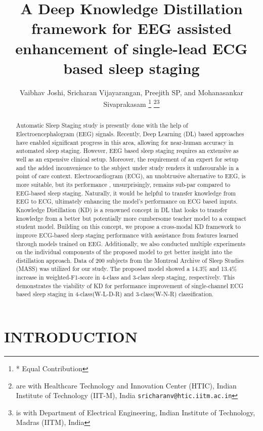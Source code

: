 \documentclass[letterpaper, 10 pt, conference]{ieeeconf}
\title{\LARGE \bf
A Deep Knowledge Distillation framework for EEG assisted enhancement of single-lead ECG based sleep staging
}
\author{Vaibhav Joshi, Sricharan Vijayarangan, Preejith SP, and Mohanasankar Sivaprakasam  \thanks{* Equal Contribution}
\thanks{ are with Healthcare Technology and Innovation Center (HTIC),
        Indian Institute of Technology (IIT-M), India
        {\tt\small sricharanv@htic.iitm.ac.in}}\thanks{ is with Department of Electrical Engineering,
        Indian Institute of Technology, Madras (IITM), India
        {}}}
\begin{document}
\maketitle



\begin{abstract}



Automatic Sleep Staging study is presently done with the help of Electroencephalogram (EEG) signals. Recently, Deep Learning (DL) based approaches have enabled significant progress in this area, allowing for near-human accuracy in automated sleep staging. However, EEG based sleep staging requires an extensive as well as an expensive clinical setup. Moreover, the requirement of an expert for setup and the added inconvenience to the subject under study renders it unfavourable in a point of care context. Electrocardiogram (ECG), an unobtrusive alternative to EEG, is more suitable, but its performance , unsurprisingly, remains sub-par compared to EEG-based sleep staging. Naturally, it would be helpful to transfer knowledge from EEG to ECG, ultimately enhancing the model's performance on ECG based inputs. Knowledge Distillation (KD) is a renowned concept in DL that looks to transfer knowledge from a better but potentially more cumbersome teacher model to a compact student model.  Building on this concept, we propose a cross-modal KD framework to improve ECG-based sleep staging performance with assistance from features learned through models trained on EEG. Additionally, we also conducted multiple experiments on the individual components of the proposed model to get better insight into the distillation approach. Data of 200 subjects from the Montreal Archive of Sleep Studies (MASS) was utilized for our study. The proposed model showed a 14.3\% and 13.4\% increase in weighted-F1-score in 4-class and 3-class sleep staging, respectively. This demonstrates the viability of KD for performance improvement of single-channel ECG based sleep staging in 4-class(W-L-D-R) and 3-class(W-N-R) classification.


\end{abstract}


\section{INTRODUCTION}
\end{document}
